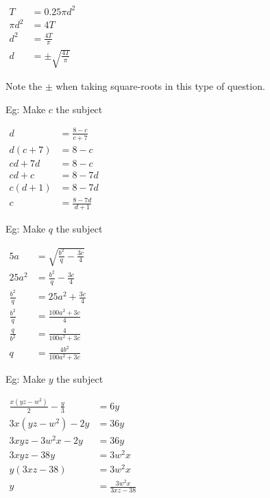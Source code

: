 \documentclass[twocolumn]{article}
\begin{document}
\noindent 
$\begin{aligned} T & =0.25 \pi d^2 \\ \pi d^2 & =4 T \\ d^2 & =\frac{4 T}{\pi} \\ d & = \pm \sqrt{\frac{4 T}{\pi}}\end{aligned}$

\noindent
Note the $\pm$ when taking square-roots in this type of question.

\bigskip 

\noindent 
Eg: Make $c$ the subject

\noindent 
$\begin{aligned} d & =\frac{8-c}{c+7} \\ d(c+7) & =8-c \\ c d+7 d & =8-c \\ c d+c & =8-7 d \\ c(d+1) & =8-7 d \\ c & =\frac{8-7 d}{d+1}\end{aligned}$

\bigskip 

\noindent 
Eg: Make $q$ the subject

\noindent 
$\begin{aligned} 5 a & =\sqrt{\frac{b^2}{q}-\frac{3 c}{4}} \\ 25 a^2 & =\frac{b^2}{q}-\frac{3 c}{4} \\ \frac{b^2}{q} & =25 a^2+\frac{3 c}{4} \\ \frac{b^2}{q} & =\frac{100 a^2+3 c}{4} \\ \frac{q}{b^2} & =\frac{4}{100 a^2+3 c} \\ q & =\frac{4 b^2}{100 a^2+3 c}\end{aligned}$

\bigskip 

\noindent 
Eg: Make $y$ the subject

\noindent 
$\begin{aligned} \frac{x\left(y z-w^2\right)}{2}-\frac{y}{3} & =6 y \\ 3 x\left(y z-w^2\right)-2 y & =36 y \\ 3 x y z-3 w^2 x-2 y & =36 y \\ 3 x y z-38 y & =3 w^2 x \\ y(3 x z-38) & =3 w^2 x \\ y & =\frac{3 w^2 x}{3 x z-38}\end{aligned}$
\end{document}
